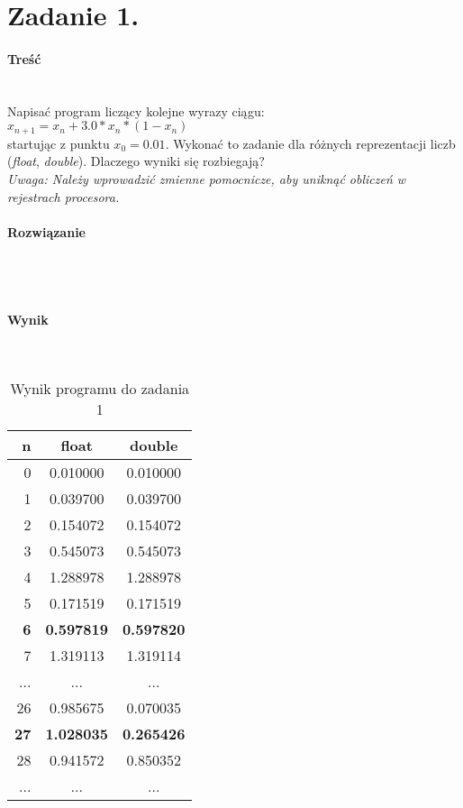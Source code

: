 \section*{Zadanie 1.} \label{sec:Zadanie1}

\paragraph{Treść} ~\\
Napisać program liczący kolejne wyrazy ciągu: \\
$ x_{n+1} = x_{n} + 3.0 * x_{n} * (1 - x_{n}) $ \\
startując z punktu $ x_{0} = 0.01 $.
Wykonać to zadanie dla różnych reprezentacji liczb (\textit{float}, \textit{double}).
Dlaczego wyniki się rozbiegają? \\
\textit{Uwaga: Należy wprowadzić zmienne pomocnicze, aby uniknąć obliczeń w rejestrach procesora.} \\

\paragraph{Rozwiązanie} ~\\
 ~\\

\paragraph{Wynik} ~\\
\begin{table}[h]
  \centering
  \begin{tabular}{r|c|c}
    n & float & double \\
    \hline 0 & 0.010000 & 0.010000 \\
    \hline 1 & 0.039700 & 0.039700 \\
    \hline 2 & 0.154072 & 0.154072 \\
    \hline 3 & 0.545073 & 0.545073 \\
    \hline 4 & 1.288978 & 1.288978 \\
    \hline 5 & 0.171519 & 0.171519 \\
    \hline \textbf{6} & \textbf{0.597819} & \textbf{0.597820} \\
    \hline 7 & 1.319113 & 1.319114 \\
    \hline ... & ... & ... \\
    \hline 26 & 0.985675 & 0.070035 \\
    \hline \textbf{27} & \textbf{1.028035} & \textbf{0.265426} \\
    \hline 28 & 0.941572 & 0.850352 \\
    \hline ... & ... & ... \\
  \end{tabular}
  \caption{Wynik programu do zadania 1}
  \label{tab:WynikProgramuDoZadania1}
\end{table}

